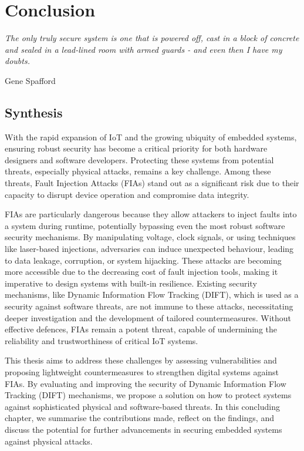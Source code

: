 \chapter{Conclusion}
\label{chapter:conclusion}

\epigraph{\textit{The only truly secure system is one that is powered off, cast in a block of concrete and sealed in a lead-lined room with armed guards - and even then I have my doubts.}}{Gene Spafford}

\minitoc

\section{Synthesis}

With the rapid expansion of IoT and the growing ubiquity of embedded systems, ensuring robust security has become a critical priority for both hardware designers and software developers. Protecting these systems from potential threats, especially physical attacks, remains a key challenge. Among these threats, Fault Injection Attacks (FIAs) stand out as a significant risk due to their capacity to disrupt device operation and compromise data integrity.

FIAs are particularly dangerous because they allow attackers to inject faults into a system during runtime, potentially bypassing even the most robust software security mechanisms. By manipulating voltage, clock signals, or using techniques like laser-based injections, adversaries can induce unexpected behaviour, leading to data leakage, corruption, or system hijacking. These attacks are becoming more accessible due to the decreasing cost of fault injection tools, making it imperative to design systems with built-in resilience. Existing security mechanisms, like Dynamic Information Flow Tracking (DIFT), which is used as a security against software threats, are not immune to these attacks, necessitating deeper investigation and the development of tailored countermeasures. Without effective defences, FIAs remain a potent threat, capable of undermining the reliability and trustworthiness of critical IoT systems.

This thesis aims to address these challenges by assessing vulnerabilities and proposing lightweight countermeasures to strengthen digital systems against FIAs. By evaluating and improving the security of Dynamic Information Flow Tracking (DIFT) mechanisms, we propose a solution on how to protect systems against sophisticated physical and software-based threats. In this concluding chapter, we summarise the contributions made, reflect on the findings, and discuss the potential for further advancements in securing embedded systems against physical attacks.

